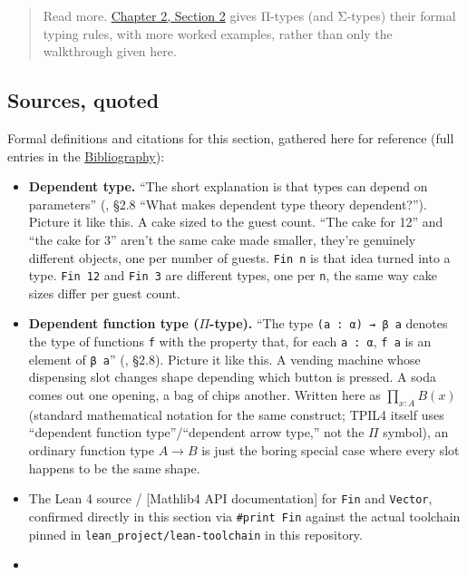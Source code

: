 \begin{quote}
Read more. \hyperref[sec:02-terminology-and-coc:02-pi-sigma-and-coc:1]{Chapter 2, Section 2} gives Π-types (and Σ-types) their formal typing rules, with more worked examples, rather than only the walkthrough given here.
\end{quote}

\subsection{Sources, quoted}\label{sec:01-basics:03-dependent-types:8}

Formal definitions and citations for this section, gathered here for reference (full entries in the \hyperref[sec:root:bibliography:1]{Bibliography}):

\begin{itemize}
\tightlist
\item
  \textbf{Dependent type.} ``The short explanation is that types can depend on parameters'' (\cite{TPIL4}, §2.8 ``What makes dependent type theory dependent?''). Picture it like this. A cake sized to the guest count. ``The cake for 12'' and ``the cake for 3'' aren't the same cake made smaller, they're genuinely different objects, one per number of guests. \texttt{Fin n} is that idea turned into a type. \texttt{Fin 12} and \texttt{Fin 3} are different types, one per \texttt{n}, the same way cake sizes differ per guest count.
\item
  \textbf{Dependent function type (\(\Pi\)-type).} ``The type \texttt{(a : α) → β a} denotes the type of functions \texttt{f} with the property that, for each \texttt{a : α}, \texttt{f a} is an element of \texttt{β a}'' (\cite{TPIL4}, §2.8). Picture it like this. A vending machine whose dispensing slot changes shape depending which button is pressed. A soda comes out one opening, a bag of chips another. Written here as \(\prod_{x:A} B(x)\) (standard mathematical notation for the same construct; TPIL4 itself uses ``dependent function type''/``dependent arrow type,'' not the \(\Pi\) symbol), an ordinary function type \(A \to B\) is just the boring special case where every slot happens to be the same shape.
\item
  The Lean 4 source / {[}Mathlib4 API documentation{]}\cite{Mathlib4Docs} for \texttt{Fin} and \texttt{Vector}, confirmed directly in this section via \texttt{\#print Fin} against the actual toolchain pinned in \texttt{lean\_\allowbreak{}project/\allowbreak{}lean-\allowbreak{}toolchain} in this repository.
\item

\end{itemize}
